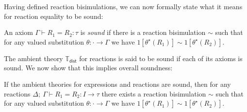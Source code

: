 \noindent Having defined reaction bisimulations, we can now formally state what it means for reaction equality to be sound:

\begin{definition}
An axiom $\Gamma \vdash R_1 = R_2 : \tau$ is \emph{sound} if there is a reaction bisimulation $\sim$ such that for any valued substitution $\theta : \cdot \to \Gamma$ we have $1[\theta^\star(R_1)] \sim 1[\theta^\star(R_2)]$.
\end{definition}

\noindent The ambient \ipdl theory $\mathbb{T}_\mathsf{dist}$ for reactions is said to be sound if each of its axioms is sound. We now show that this implies overall soundness:

\begin{lemma}
If the ambient \ipdl theories for expressions and reactions are sound, then for any reactions $\Delta; \ \Gamma \vdash R_1 = R_2 : I \to \tau$ there exists a reaction bisimulation $\sim$ such that for any valued substitution $\theta : \cdot \to \Gamma$ we have $1[\theta^\star(R_1)] \sim 1[\theta^\star(R_2)]$.
\end{lemma}

